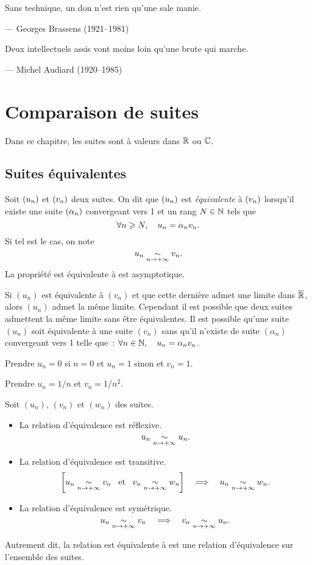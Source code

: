 \documentclass{magnoliaold}
\begin{document}
\setlength{}
\epigraph{\og Sans technique, un don n'est rien qu'une sale manie.\fg}{--- {\sc Georges Brassens (1921--1981)}}
\setlength{}
\epigraph{\og Deux intellectuels assis vont moins loin qu'une brute qui marche. \fg}{--- {\sc Michel Audiard (1920--1985)}}

\magtoc


\section{Comparaison de suites}

Dans ce chapitre, les suites sont à valeurs dans $\mathbb{R}$ ou $\mathbb{C}$.

\subsection{Suites équivalentes}

\begin{definition}[utile=-3]
Soit $\left(u_n\right)$ et $\left(v_n\right)$ deux suites. On dit que $\left(u_n\right)$ est \emph{équivalente} à
$\left(v_n\right)$ lorsqu'il existe une suite $\left(\alpha_n\right)$ convergeant vers 1 et un rang
$N\in\mathbb{N}$ tels que
\[\forall n\geqslant N ,\quad u_n=\alpha_n v_n.\]
Si tel est le cas, on note
\[u_n \underset{n\rightarrow +\infty}{\sim} v_n.\]
La propriété \og est équivalente à \fg est asymptotique.
\end{definition}

\begin{remarques}
\remarque Si $(u_n)$ est équivalente à $(v_n)$ et que cette dernière admet une
  limite dans $\overline{\mathbb{R}}$, alors $(u_n)$ admet la même limite. Cependant
  il est possible que deux suites admettent la même limite sans être
  équivalentes.
\remarque Il est possible qu'une suite $(u_n)$ soit équivalente à une suite
  $(v_n)$ sans qu'il n'existe de suite $(\alpha_n)$ convergeant vers 1 telle que~:
  $\forall n\in\mathbb{N},\quad u_n=\alpha_n v_n$.
  \begin{sol}
  Prendre $u_n=0$ si $n=0$ et $u_n=1$ sinon et $v_n=1$.
  \end{sol}
\end{remarques}
\begin{sol}
Prendre $u_n=1/n$ et $v_n=1/n^2$.
\end{sol}

\begin{proposition}[utile=-3]
Soit $(u_n)$, $(v_n)$ et $(w_n)$ des suites.
\begin{itemize}
\item La relation d'équivalence est réflexive.
  \[u_n \underset{n\rightarrow +\infty}{\sim} u_n.\]
\item La relation d'équivalence est transitive.
  \[\left[u_n \underset{n\rightarrow +\infty}{\sim} v_n \quad\!\text{et}\quad\! v_n\underset{n\rightarrow +\infty}{\sim} w_n\right]\quad\Longrightarrow\quad
    u_n \underset{n\rightarrow +\infty}{\sim} w_n.\]
\item La relation d'équivalence est symétrique.
  \[u_n\underset{n\rightarrow +\infty}{\sim}v_n \quad\Longrightarrow\quad v_n\underset{n\rightarrow +\infty}{\sim}u_n.\]
  \end{itemize}
Autrement dit, la relation \og est équivalente à \fg est une relation d'équivalence sur
l'ensemble des suites. 
\end{proposition}
\end{document}
